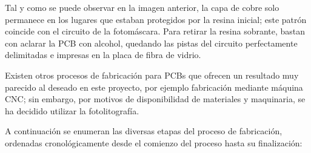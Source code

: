 \begin{itemize}
    Tal y como se puede observar en la imagen anterior, la capa de cobre solo permanece en los lugares que estaban protegidos por la resina inicial; este patrón coincide con el circuito de la fotomáscara. Para retirar la resina sobrante, bastan con aclarar la \ac{PCB} con alcohol, quedando las pistas del circuito perfectamente delimitadas e impresas en la placa de fibra de vidrio.
    
\end{itemize}

Existen otros procesos de fabricación para \ac{PCB}s que ofrecen un resultado muy parecido al deseado en este proyecto, por ejemplo fabricación mediante máquina CNC; sin embargo, por motivos de disponibilidad de materiales y maquinaria, se ha decidido utilizar la fotolitografía.

A continuación se enumeran las diversas etapas del proceso de fabricación, ordenadas cronológicamente desde el comienzo del proceso hasta su finalización:

